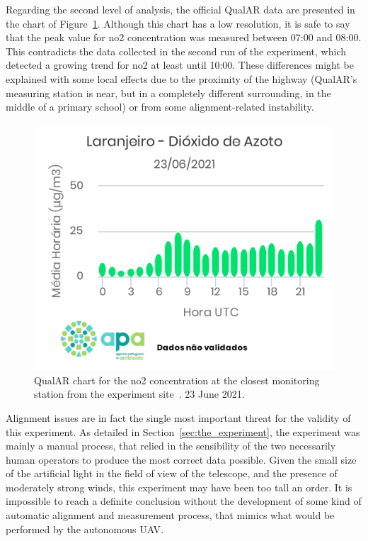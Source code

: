 Regarding the second level of analysis, the official QualAR data are
presented in the chart of Figure~\ref{fig:qualar_2306}. Although this
chart has a low resolution, it is safe to say that the peak value for
\gls{no2} concentration was measured between 07:00 and 08:00. This
contradicts the data collected in the second run of the experiment,
which detected a growing trend for \gls{no2} at least until 10:00. These
differences might be explained with some local effects due to the
proximity of the highway (QualAR's measuring station is near, but in a
completely different surrounding, in the middle of a primary school) or
from some alignment-related instability. 

\begin{figure}[htpb]
    \centering
    \includegraphics[width=0.8\linewidth]{img/pdf/no2_23jun_apa_chart.pdf}
    \caption{QualAR chart for the \gls{no2} concentration at
    the closest monitoring station from the experiment
    site~\cite{Ambiente2019}. 23 June 2021.}
    \label{fig:qualar_2306}
\end{figure}

Alignment issues are in fact the single most important threat for the
validity of this experiment. As detailed in
Section~\ref{sec:the_experiment}, the experiment was mainly a manual
process, that relied in the sensibility of the two necessarily human
operators to produce the most correct data possible. Given the small
size of the artificial light in the field of view of the telescope, and
the presence of moderately strong winds, this experiment may have been
too tall an order. It is impossible to reach a definite conclusion
without the development of some kind of automatic alignment and
measurement process, that mimics what would be performed by the
autonomous \gls{UAV}.

